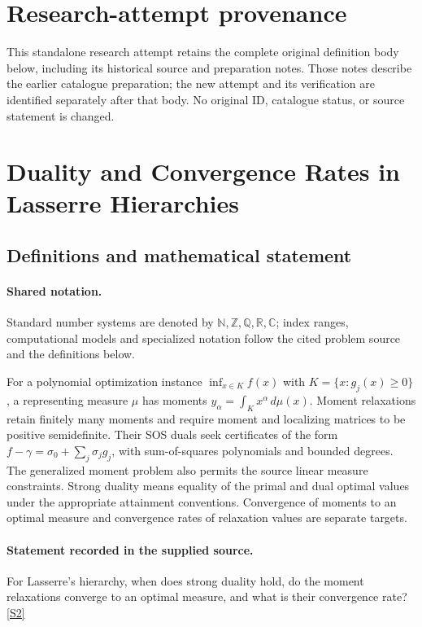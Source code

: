 \documentclass[11pt]{article}
\begin{document}
\section*{Research-attempt provenance}
This standalone research attempt retains the complete original definition body below,
including its historical source and preparation notes. Those notes describe the
earlier catalogue preparation; the new attempt and its verification are identified
separately after that body. No original ID, catalogue status, or source statement is changed.

\section{Duality and Convergence Rates in Lasserre Hierarchies}\label{statement}

\subsection{Definitions and mathematical statement}

\paragraph{Shared notation.}Standard number systems are denoted by $\mathbb N,\mathbb Z,\mathbb Q,\mathbb R,\mathbb C$; index ranges, computational models and specialized notation follow the cited problem source and the definitions below.


For a polynomial optimization instance $\inf_{x\in K}f(x)$ with $K=\{x:g_j(x)\geq0\}$, a representing measure $\mu$ has moments $y_\alpha=\int_K x^\alpha\,d\mu(x)$. Moment relaxations retain finitely many moments and require moment and localizing matrices to be positive semidefinite. Their SOS duals seek certificates of the form $f-\gamma=\sigma_0+\sum_j\sigma_jg_j$, with sum-of-squares polynomials and bounded degrees. The generalized moment problem also permits the source linear measure constraints. Strong duality means equality of the primal and dual optimal values under the appropriate attainment conventions. Convergence of moments to an optimal measure and convergence rates of relaxation values are separate targets.
\paragraph{Statement recorded in the supplied source.}
For Lasserre's hierarchy, when does strong duality hold, do the moment relaxations converge to an optimal measure, and what is their convergence rate? \href{https://doi.org/10.4171/owr/2023/35}{[S2]}
\end{document}
